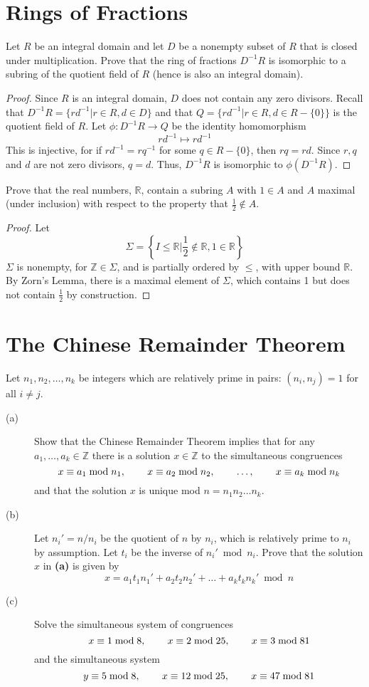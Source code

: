 \documentclass[12pt,leqno]{book}
\numberwithin{equation}{section}
\newcommand{\question}[2] {\vspace{.25in}\noindent\fbox{#1} #2 \vspace{.10in}}
\theoremstyle{definition}
\begin{document}
\section{Rings of Fractions}
\question{2}{Let $R$ be an integral domain and let $D$ be a nonempty subset of $R$ that is closed under multiplication. Prove that the ring of fractions $D^{-1}R$ is isomorphic to a subring of the quotient field of $R$ (hence is also an integral domain).}

\begin{proof}
 Since $R$ is an integral domain, $D$ does not contain any zero divisors. Recall that $D^{-1}R=\{rd^{-1}|r\in R,d\in D\}$ and that $Q=\{rd^{-1}|r\in R,d\in R-\{0\}\}$ is the quotient field of $R$. Let $\phi:D^{-1}R\to Q$ be the identity homomorphism \[rd^{-1}\mapsto rd^{-1}\] This is injective, for if $rd^{-1}=rq^{-1}$ for some $q\in R-\{0\}$, then $rq=rd$. Since $r,q$ and $d$ are not zero divisors, $q=d$. Thus, $D^{-1}R$ is isomorphic to $\phi(D^{-1}R)$.
\end{proof}

\question{6}{Prove that the real numbers, $\mathbb{R}$, contain a subring $A$ with $1\in A$ and $A$ maximal (under inclusion) with respect to the property that $\frac{1}{2}\not\in A$.}

\begin{proof}
Let \[\Sigma=\left\{I\leq\mathbb{R}\Big|\frac{1}{2}\notin\mathbb{R},1\in\mathbb{R}\right\}\] $\Sigma$ is nonempty, for $\mathbb{Z}\in\Sigma$, and is partially ordered by $\leq$, with upper bound $\mathbb{R}$. By Zorn's Lemma, there is a maximal element of $\Sigma$, which contains 1 but does not contain $\frac{1}{2}$ by construction. 
\end{proof}

\section{The Chinese Remainder Theorem}
\question{5}{Let $n_1,n_2,\hdots,n_k$ be integers which are relatively prime in pairs: $(n_i,n_j)=1$ for all $i\not=j$.}
\begin{description}
 \item [(a)] Show that the Chinese Remainder Theorem implies that for any $a_1,\hdots,a_k\in\mathbb{Z}$ there is a solution $x\in\mathbb{Z}$ to the simultaneous congruences \[x\equiv a_1\bmod{n_1},\hskip.3in x\equiv a_2\bmod{n_2},\hskip.3in\hdots,\hskip.3in x\equiv a_k\bmod{n_k}\] and that the solution $x$ is unique mod $n=n_1n_2\hdots n_k$.
 \item [(b)] Let $n_i'=n/n_i$ be the quotient of $n$ by $n_i$, which is relatively prime to $n_i$ by assumption. Let $t_i$ be the inverse of $n_i'\bmod{n_i}$. Prove that the solution $x$ in \textbf{(a)} is given by \[x=a_1t_1n_1'+a_2t_2n_2'+\hdots+a_kt_kn_k'\bmod{n}\]
 \item [(c)] Solve the simultaneous system of congruences\[x\equiv1\bmod{8},\hskip.3in x\equiv2\bmod{25},\hskip.3in x\equiv3\bmod{81}\] and the simultaneous system \[y\equiv5\bmod{8},\hskip.3in x\equiv12\bmod{25},\hskip.3in x\equiv47\bmod{81}\]
\end{description}
\end{document}
